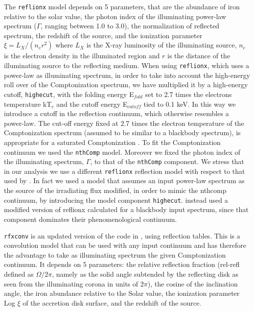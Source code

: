 \documentclass{aa}
\begin{document}
The \texttt{reflionx} model depends on 5 parameters, that are 
the abundance of iron relative to the solar value, the photon index of 
the illuminating power-law spectrum ($\Gamma$, ranging between 1.0 to 3.0), 
the normalization of reflected spectrum, the redshift of the source, 
and the ionization parameter $\xi = L_X / (n_e r^2)$ where $L_X$ is the 
X-ray luminosity of the illuminating source, $n_e$ is the electron density 
in the illuminated region and $r$ is the distance of the illuminating 
source to the reflecting medium. 
When using \texttt{reflionx}, which uses a power-law as illuminating 
spectrum, in order to take into account the high-energy roll over of the 
Comptonization spectrum, we have multiplied it by a 
high-energy cutoff, \texttt{highecut}, with the folding energy 
E$_{fold}$ set to 2.7 times the electrons temperature kT$_{e}$ 
and the cutoff energy E$_{cutoff}$ tied to 0.1 keV. In this 
way we introduce a cutoff in the reflection continuum, which otherwise 
resembles a power-law. The cut-off energy fixed at 2.7 times the 
electron temperature of the Comptonization spectrum (assumed to be 
similar to a blackbody spectrum), is appropriate for a saturated 
Comptonization \citep[see e.g.][]{Egron.etal:13}. To fit the 
Comptonization continuum we used the \texttt{nthComp} model.  
Moreover we fixed the photon index of the illuminating spectrum, 
$\Gamma$, to that of the \texttt{nthComp} component.  
We stress  that in our analysis we use a different 
\texttt{reflionx} reflection model with respect to that used by 
\citet{Miller.etal:13}. In fact we used a model  that assumes an 
input power-law spectrum as the source of the irradiating flux modified, 
in order to mimic the nthcomp continuum, by introducing the model 
component \texttt{highecut}. \citet{Miller.etal:13} instead used a 
modified version of reflionx calculated for a blackbody input spectrum, 
since that component dominates their phenomenological continuum.

\texttt{rfxconv} is an updated version of the code in \cite{Done.etal:06}, 
using \cite{Ross.etal:05} reflection tables. 
This is a convolution model that can be used with any input continuum 
and has therefore the advantage to take as illuminating spectrum the
given Comptonization continuum.  It depends on 5 parameters: 
the relative reflection fraction (rel-refl defined as $\Omega/2\pi$,
namely as the solid angle subtended by the reflecting disk as seen from
the illuminating corona in units of $2\pi$), the cosine of the inclination 
angle, the iron abundance relative to the Solar value, the ionization 
parameter Log $\xi$ of the accretion disk surface, and the redshift of 
the source. 
\end{document}
